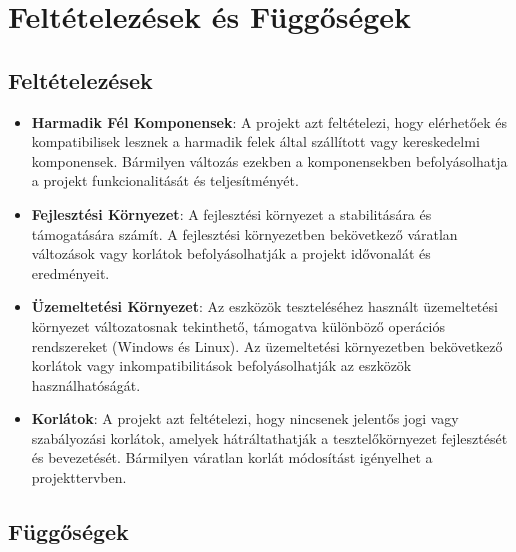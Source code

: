 \documentclass{scrreprt}
\begin{document}
\section{Feltételezések és Függőségek}

\subsection{Feltételezések}

\begin{itemize}
      \item \textbf{Harmadik Fél Komponensek}:
            A projekt azt feltételezi, hogy elérhetőek és kompatibilisek lesznek a harmadik felek által szállított vagy kereskedelmi komponensek. Bármilyen változás ezekben a komponensekben befolyásolhatja a projekt funkcionalitását és teljesítményét.
      \item \textbf{Fejlesztési Környezet}:
            A fejlesztési környezet a stabilitására és támogatására számít. A fejlesztési környezetben bekövetkező váratlan változások vagy korlátok befolyásolhatják a projekt idővonalát és eredményeit.
      \item \textbf{Üzemeltetési Környezet}:
            Az eszközök teszteléséhez használt üzemeltetési környezet változatosnak tekinthető, támogatva különböző operációs rendszereket (Windows és Linux). Az üzemeltetési környezetben bekövetkező korlátok vagy inkompatibilitások befolyásolhatják az eszközök használhatóságát.
      \item \textbf{Korlátok}:
            A projekt azt feltételezi, hogy nincsenek jelentős jogi vagy szabályozási korlátok, amelyek hátráltathatják a tesztelőkörnyezet fejlesztését és bevezetését. Bármilyen váratlan korlát módosítást igényelhet a projekttervben.
\end{itemize}

\subsection{Függőségek}
\end{document}
